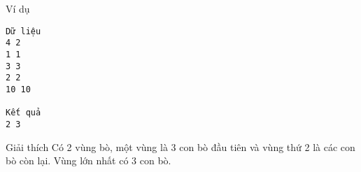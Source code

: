 Ví dụ
\begin{verbatim}
Dữ liệu
4 2
1 1
3 3
2 2
10 10

Kết quả
2 3
\end{verbatim}
Giải thích
Có 2 vùng bò, một vùng là 3 con bò đầu tiên và vùng thứ 2 là các con bò còn lại. Vùng lớn nhất có 3 con bò.